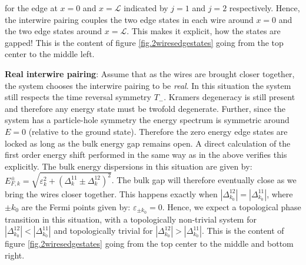 for the edge at $x = 0$ and $x = \mathcal{L}$ indicated by $j = 1$ and $j = 2$ respectively. Hence, the interwire pairing couples the two edge states in each wire around $x = 0$ and the two edge states around $x = \mathcal{L}$. This makes it explicit, how the states are gapped! This is the content of figure \ref{fig.2wiresedgestates} going from the top center to the middle left. 

\textbf{Real interwire pairing}: Assume that as the wires are brought closer together, the system chooses the interwire pairing to be \textit{real}. In this situation the system still respects the time reversal symmetry $T_-$. Kramers degeneracy is still present and therefore any energy state must be twofold degenerate. Further, since the system has a particle-hole symmetry the energy spectrum is symmetric around $E = 0$ (relative to the ground state). Therefore the zero energy edge states are locked as long as the bulk energy gap remains open. A direct calculation of the first order energy shift performed in the same way as in the above verifies this explicitly. The bulk energy dispersions in this situation are given by: $E^{\pm}_{F,k} = \sqrt{\varepsilon^2_k + (\Delta^{11}_k \pm \Delta^{12}_k)^2}$. The bulk gap will therefore eventually close as we bring the wires closer together. This happens exactly when $|\Delta^{12}_{k_0}| = |\Delta^{11}_{k_0}|$, where $\pm k_0$ are the Fermi points given by: $\varepsilon_{\pm k_0} = 0$. Hence, we expect a topological phase transition in this situation, with a topologically non-trivial system for $|\Delta^{12}_{k_0}| < |\Delta^{11}_{k_0}|$ and topologically trivial for $|\Delta^{12}_{k_0}| > |\Delta^{11}_{k_0}|$. This is the content of figure \ref{fig.2wiresedgestates} going from the top center to the middle and bottom right. 

